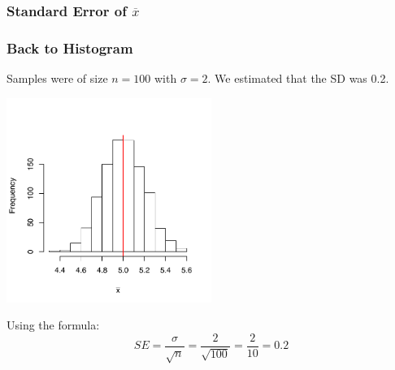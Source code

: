 \documentclass[slides]{beamer}
\newcommand{\blue}[1]{\textcolor{blue2}{#1}}
\newcommand{\xbar}{\overline{x}}
\begin{document}
\begin{frame}[fragile]
\frametitle{Standard Error of $\xbar$}

%
%
%
%

\end{frame}


\begin{frame}[fragile]
\frametitle{Back to Histogram}
Samples were of size $n=100$ with $\sigma=2$.  We estimated that the SD was 0.2. 
\begin{center}
\includegraphics[width=0.5\textwidth]{figure/lec12-001}
\end{center}

\pause Using the formula:
\[
SE = \frac{\sigma}{\sqrt{n}} = \frac{2}{\sqrt{100}} = \frac{2}{10} = 0.2
\]

\end{frame}
\end{document}
